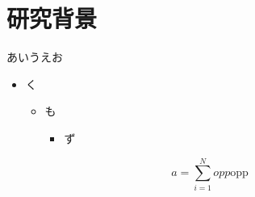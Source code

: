 \section{研究背景}


\begin{frame}
    あいうえお\cite{sakamoto2022transcriptional}
    \begin{itemize}
        \item く
        \begin{itemize}
            \item も
            \begin{itemize}
                \item ず
            \end{itemize}
        \end{itemize}
    \end{itemize}
    \begin{equation}
        a = \sum _{i=1}^N opp \text{opp}
    \end{equation}
\end{frame}
